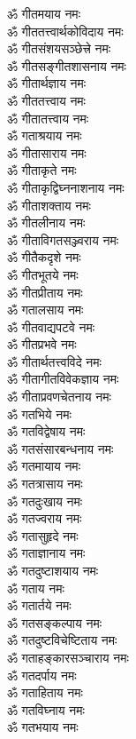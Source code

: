 \begin{multicols}{2}
\begin{flushleft}
ॐ गीतमयाय नमः\\
ॐ गीततत्त्वार्थकोविदाय नमः\\
ॐ गीतसंशयसञ्छेत्त्रे नमः\\
ॐ गीतसङ्गीतशासनाय नमः\\
ॐ गीतार्थज्ञाय नमः\\
ॐ गीततत्त्वाय नमः\\
ॐ गीतातत्त्वाय नमः\hfill{}\\
ॐ गताश्रयाय नमः\\
ॐ गीतासाराय नमः\\
ॐ गीताकृते नमः\\
ॐ गीताकृद्विघ्ननाशनाय नमः\\
ॐ गीताशक्ताय नमः\\
ॐ गीतलीनाय नमः\\
ॐ गीताविगतसञ्ज्वराय नमः\\
ॐ गीतैकदृशे नमः\\
ॐ गीतभूतये नमः\\
ॐ गीतप्रीताय नमः\hfill{}\\
ॐ गतालसाय नमः\\
ॐ गीतवाद्यपटवे नमः\\
ॐ गीतप्रभवे नमः\\
ॐ गीतार्थतत्त्वविदे नमः\\
ॐ गीतागीतविवेकज्ञाय नमः\\
ॐ गीताप्रवणचेतनाय नमः\\
ॐ गतभिये नमः\\
ॐ गतविद्वेषाय नमः\\
ॐ गतसंसारबन्धनाय नमः\\
ॐ गतमायाय नमः\hfill{}\\
ॐ गतत्रासाय नमः\\
ॐ गतदुःखाय नमः\\
ॐ गतज्वराय नमः\\
ॐ गतासुहृदे नमः\\
ॐ गताज्ञानाय नमः\\
ॐ गतदुष्टाशयाय नमः\\
ॐ गताय नमः\\
ॐ गतार्तये नमः\\
ॐ गतसङ्कल्पाय नमः\\
ॐ गतदुष्टविचेष्टिताय नमः\hfill{}\\
ॐ गताहङ्कारसञ्चाराय नमः\\
ॐ गतदर्पाय नमः\\
ॐ गताहिताय नमः\\
ॐ गतविघ्नाय नमः\\
ॐ गतभयाय नमः\\

\end{flushleft}
\end{multicols}
